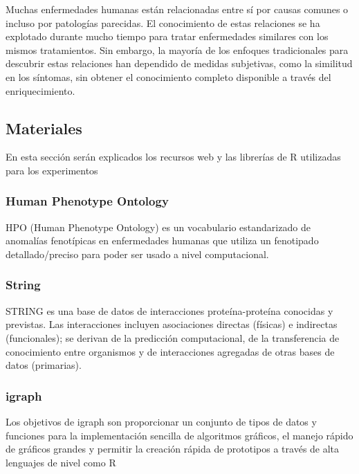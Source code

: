 \hfill

Muchas enfermedades humanas están relacionadas \cite{Enriquecimiento2} entre sí por causas comunes o incluso por patologías parecidas. El conocimiento de estas relaciones se ha explotado durante mucho tiempo para tratar enfermedades similares con los mismos tratamientos. Sin embargo, la mayoría de los enfoques tradicionales para descubrir estas relaciones han dependido de medidas subjetivas, como la similitud en los síntomas, sin obtener el conocimiento completo disponible a través del enriquecimiento.

\hfill

\subsection{Materiales}

En esta sección serán explicados los recursos web y las librerías de R utilizadas para los experimentos

\subsubsection{Human Phenotype Ontology}

HPO (Human Phenotype Ontology)\cite{HPO_paper} es un vocabulario estandarizado de anomalías fenotípicas en enfermedades humanas que utiliza un fenotipado detallado/preciso para poder ser usado a nivel computacional.

\hfill

\subsubsection{String}

STRING \cite{String_paper} es una base de datos de interacciones proteína-proteína conocidas y previstas. Las interacciones incluyen asociaciones directas (físicas) e indirectas (funcionales); se derivan de la predicción computacional, de la transferencia de conocimiento entre organismos y de interacciones agregadas de otras bases de datos (primarias).

\subsubsection{igraph}

Los objetivos de igraph son proporcionar un conjunto de tipos de datos y funciones para la implementación sencilla de algoritmos gráficos, el manejo rápido de gráficos grandes y permitir la creación rápida de prototipos a través de alta lenguajes de nivel como R

